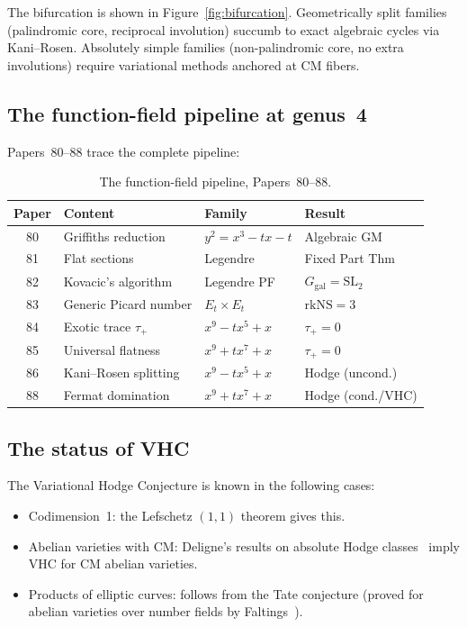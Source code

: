 \documentclass[11pt]{article}
\theoremstyle{plain}
\theoremstyle{definition}
\theoremstyle{remark}
\newcommand{\SL}{\mathrm{SL}}
\newcommand{\rk}{\mathrm{rk}}
\newcommand{\Ggal}{G_{\mathrm{gal}}}
\newcommand{\NS}{\mathrm{NS}}
\begin{document}
The bifurcation is shown in Figure~\ref{fig:bifurcation}.
Geometrically split families (palindromic core, reciprocal
involution) succumb to exact algebraic cycles via Kani--Rosen.
Absolutely simple families (non-palindromic core, no extra
involutions) require variational methods anchored at CM fibers.

\subsection{The function-field pipeline at genus~4}

Papers~80--88 trace the complete pipeline:

\begin{table}[h]
\centering
\small
\begin{tabular}{c l l l}
\toprule
\textbf{Paper} & \textbf{Content} & \textbf{Family} & \textbf{Result} \\
\midrule
80 & Griffiths reduction & $y^2 = x^3 - tx - t$ & Algebraic GM \\
81 & Flat sections & Legendre & Fixed Part Thm \\
82 & Kovacic's algorithm & Legendre PF & $\Ggal = \SL_2$ \\
83 & Generic Picard number & $E_t \times E_t$ & $\rk\NS = 3$ \\
84 & Exotic trace $\tau_+$ & $x^9 - tx^5 + x$ & $\tau_+ = 0$ \\
85 & Universal flatness & $x^9 + tx^7 + x$ & $\tau_+ = 0$ \\
86 & Kani--Rosen splitting & $x^9 - tx^5 + x$ & Hodge (uncond.) \\
88 & Fermat domination & $x^9 + tx^7 + x$ & Hodge (cond./VHC) \\
\bottomrule
\end{tabular}
\caption{The function-field pipeline, Papers~80--88.}
\label{tab:pipeline}
\end{table}

\subsection{The status of VHC}

The Variational Hodge Conjecture is known in the following cases:
\begin{itemize}[nosep]
  \item Codimension~1: the Lefschetz $(1,1)$ theorem gives this.
  \item Abelian varieties with CM: Deligne's results on absolute
    Hodge classes~\cite{Deligne82} imply VHC for CM abelian
    varieties.
  \item Products of elliptic curves: follows from the Tate
    conjecture (proved for abelian varieties over number
    fields by Faltings~\cite{Faltings83}).
\end{itemize}
\end{document}
